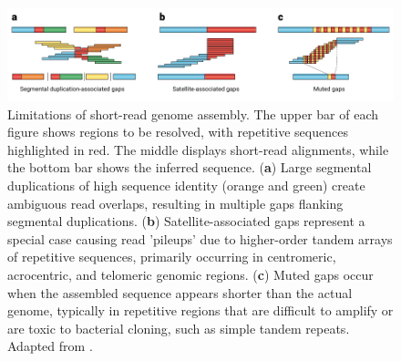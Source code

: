\begin{figure}[H]
    \centering
    \includegraphics[width=\textwidth]{img/assembly_gaps.pdf}
    \caption[Limitations of short-read genome assembly]{Limitations of short-read 
    genome assembly. The upper bar of each figure shows regions to be resolved, 
    with repetitive sequences highlighted in red. The middle displays 
    short-read alignments, while the bottom bar shows the inferred sequence. 
    (\textbf{a}) Large segmental duplications of high sequence identity (orange 
    and green) create ambiguous read overlaps, resulting in multiple gaps flanking 
    segmental duplications. (\textbf{b}) Satellite-associated gaps represent 
    a special case causing read 'pileups' due to higher-order tandem arrays of 
    repetitive sequences, primarily occurring in centromeric, acrocentric, and 
    telomeric genomic regions. (\textbf{c}) Muted gaps occur when the assembled 
    sequence appears shorter than the actual genome, typically in repetitive 
    regions that are difficult to amplify or are toxic to bacterial cloning, 
    such as simple tandem repeats. Adapted from \cite{chaisson_genetic_2015}.}
    \label{fig:assembly_gaps}
\end{figure}

